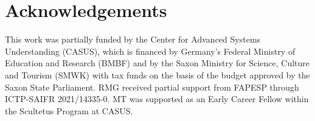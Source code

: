 \documentclass[11pt, a4paper]{article}
\theoremstyle{break}
\theoremstyle{break}
\theoremstyle{break}
\theoremstyle{break}
\theoremstyle{break}
\theoremstyle{break}
\theoremstyle{break}
\theoremstyle{break}
\theoremstyle{break}
\theoremstyle{break}
\begin{document}
\section*{Acknowledgements}
This work was partially funded by the Center for Advanced Systems Understanding (CASUS), which is financed by Germany’s Federal Ministry of Education and Research (BMBF) and by the Saxon Ministry for Science, Culture and Tourism (SMWK) with tax funds on the basis of the budget approved by the Saxon State Parliament. RMG received partial support from FAPESP through ICTP-SAIFR 2021/14335-0. MT was supported as an Early Career Fellow within the Scultetus Program at CASUS.



\end{document}
